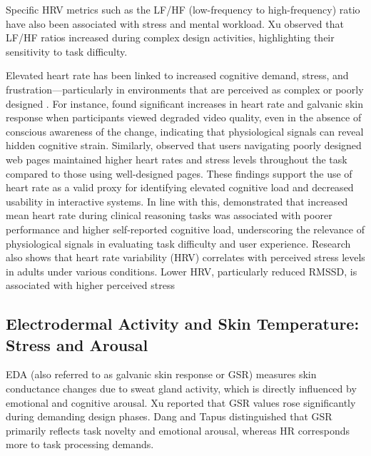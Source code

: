 \documentclass{CPP}
\begin{document}
Specific HRV metrics such as the LF/HF (low-frequency to high-frequency) ratio have also been associated with stress and mental workload. Xu \citep{Xu2014} observed that LF/HF ratios increased during complex design activities, highlighting their sensitivity to task difficulty.

Elevated heart rate has been linked to increased cognitive demand, stress, and frustration—particularly in environments that are perceived as complex or poorly designed \citep{andreassi2000psychophysiology,solhjoo2019heart,ward2003physiological,wilson2001psychophysiological}. For instance, \citet{wilson2001psychophysiological} found significant increases in heart rate and galvanic skin response when participants viewed degraded video quality, even in the absence of conscious awareness of the change, indicating that physiological signals can reveal hidden cognitive strain. Similarly, \citet{ward2003physiological} observed that users navigating poorly designed web pages maintained higher heart rates and stress levels throughout the task compared to those using well-designed pages. These findings support the use of heart rate as a valid proxy for identifying elevated cognitive load and decreased usability in interactive systems. In line with this, \citet{solhjoo2019heart} demonstrated that increased mean heart rate during clinical reasoning tasks was associated with poorer performance and higher self-reported cognitive load, underscoring the relevance of physiological signals in evaluating task difficulty and user experience. Research also shows that heart rate variability (HRV) correlates with perceived stress levels in adults under various conditions. Lower HRV, particularly reduced RMSSD, is associated with higher perceived stress \cite{Tyapochkin2020SmartphoneStress,Sin2016LinkingDS,Silva2015HRVStress}


\subsection{Electrodermal Activity and Skin Temperature: Stress and Arousal}

EDA (also referred to as galvanic skin response or GSR) measures skin conductance changes due to sweat gland activity, which is directly influenced by emotional and cognitive arousal. Xu \citep{Xu2014} reported that GSR values rose significantly during demanding design phases. Dang and Tapus \citep{Dang2014} distinguished that GSR primarily reflects task novelty and emotional arousal, whereas HR corresponds more to task processing demands.
\end{document}
